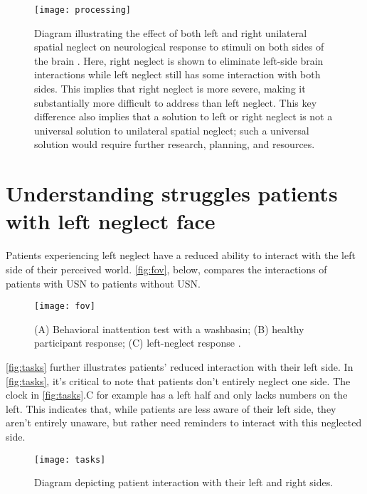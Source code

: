 \begin{figure}[h]
  \centering
  \texttt{[image: processing]}
  \caption[Environment processing in the brain.]{Diagram illustrating the
    effect of both left and right unilateral spatial neglect on neurological
    response to stimuli on both sides of the brain
    \cite{noauthor_half_2016}. Here, right neglect is 
    shown to eliminate left-side brain interactions while left neglect still
    has some interaction with both sides. This implies that right neglect is
    more severe, making it substantially more difficult to address than left
    neglect. This key difference also implies that a solution to left or right
    neglect is not a universal solution to unilateral spatial neglect; such a
    universal solution would require further research, planning, and
    resources.}
  \label{fig:processing}
\end{figure}

\section{Understanding struggles patients with left neglect face}

Patients experiencing left neglect have a reduced ability to interact with the
left side of their perceived world. \autoref{fig:fov}, below, compares the
interactions of patients with USN to patients without USN. 

\begin{figure}[h]
  \centering
  \texttt{[image: fov]}
  \caption[Field of view comparison.]{(A) Behavioral inattention test with a
    washbasin; (B) healthy participant response; (C) left-neglect
    response \cite{gammeri_unilateral_2020}.}
  \label{fig:fov}
\end{figure}

\autoref{fig:tasks} further illustrates patients’ reduced interaction with
their left side. In \autoref{fig:tasks}, it’s critical to note that patients
don’t entirely neglect one side. The clock in \autoref{fig:tasks}.C for example
has a left half and only lacks numbers on the left. This indicates that, while
patients are less aware of their left side, they aren’t entirely unaware, but
rather need reminders to interact with this neglected side.

\begin{figure}[h]
  \centering
  \texttt{[image: tasks]}
  \caption{Diagram depicting patient interaction with their left and right
    sides. \cite{ting_visual_2011}}
  \label{fig:tasks}
\end{figure}


